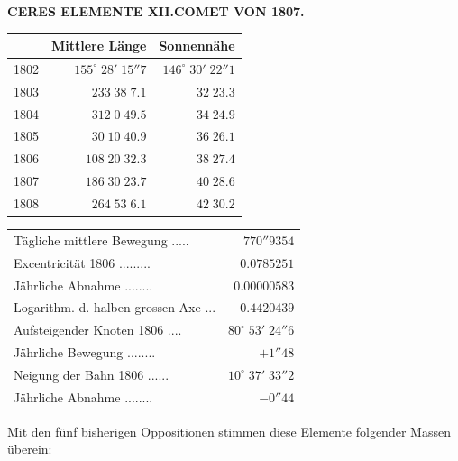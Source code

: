 \clearpage
\thispagestyle{empty}
\noindent{}%
%
\parbox[t]{\dimexpr\linewidth-24mm\relax}{\centering\footnotesize\bfseries CERES ELEMENTE XII.\enspace COMET VON 1807.\par}%
\makebox[12mm][r]{}\par\nobreak\medskip
\begin{center}\fontsize{8.5}{10.5}\selectfont\setlength{\tabcolsep}{3pt}\renewcommand{\arraystretch}{1.15}\begin{tabular}[b]{@{}l|r|r@{}}
& Mittlere Länge & Sonnennähe\\\hline
1802 & $155^\circ\;28'\;15''7$ & $146^\circ\;30'\;22''1$\\
1803 & $233\;38\;7.1$ & $32\;23.3$\\
1804 & $312\;0\;49.5$ & $34\;24.9$\\
1805 & $30\;10\;40.9$ & $36\;26.1$\\
1806 & $108\;20\;32.3$ & $38\;27.4$\\
1807 & $186\;30\;23.7$ & $40\;28.6$\\
1808 & $264\;53\;6.1$ & $42\;30.2$\\
\end{tabular}\quad
\begin{tabular}[b]{@{}lr@{}}
Tägliche mittlere Bewegung .\;.\;.\;.\;.\; & $770''9354$\\
Excentricität 1806 .\;.\;.\;.\;.\;.\;.\;.\;.\; & $0.0785251$\\
Jährliche Abnahme .\;.\;.\;.\;.\;.\;.\;.\; & $0.00000583$\\
Logarithm. d. halben grossen Axe .\;.\;.\; & $0.4420439$\\
Aufsteigender Knoten 1806 .\;.\;.\;.\; & $80^\circ\;53'\;24''6$\\
Jährliche Bewegung .\;.\;.\;.\;.\;.\;.\;.\; & $+1''48$\\
Neigung der Bahn 1806 .\;.\;.\;.\;.\;.\; & $10^\circ\;37'\;33''2$\\
Jährliche Abnahme .\;.\;.\;.\;.\;.\;.\;.\; & $-0''44$\\
\end{tabular}\end{center}

\par\indent Mit den fünf bisherigen Oppositionen stimmen diese Elemente folgender Massen überein:

